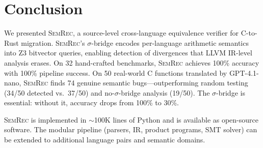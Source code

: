 \documentclass[11pt,a4paper]{article}
\begin{document}
\section{Conclusion}\label{sec:conclusion}

We presented \textsc{SemRec}, a source-level cross-language equivalence
verifier for C-to-Rust migration.  \textsc{SemRec}'s $\sigma$-bridge
encodes per-language arithmetic semantics into Z3 bitvector queries,
enabling detection of divergences that LLVM IR-level analysis erases.
On 32 hand-crafted benchmarks, \textsc{SemRec} achieves 100\% accuracy
with 100\% pipeline success.  On 50 real-world C functions translated by
GPT-4.1-nano, \textsc{SemRec} finds 74 genuine semantic
bugs---outperforming random testing (34/50 detected vs.\ 37/50) and
no-$\sigma$-bridge analysis (19/50).  The $\sigma$-bridge is essential:
without it, accuracy drops from 100\% to 30\%.

\textsc{SemRec} is implemented in $\sim$100K lines of Python and is
available as open-source software.  The modular pipeline (parsers, IR,
product programs, SMT solver) can be extended to additional language
pairs and semantic domains.
\end{document}

